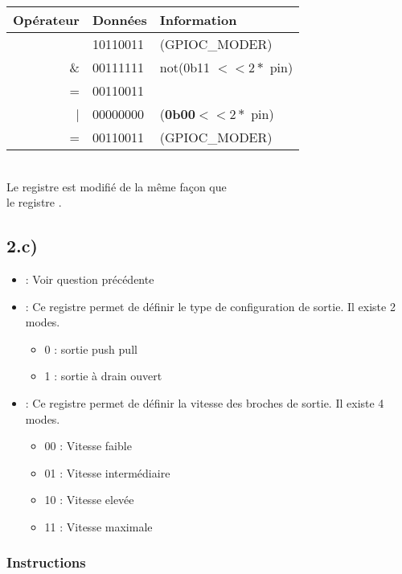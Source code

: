 \documentclass[12pt]{report}
\renewcommand{\bold}[1]{\textbf{#1}}
\begin{document}
\begin{tabular}{rl|l}
  Opérateur & Données & Information \\
\hline
    & 10110011 & (GPIOC\_MODER)\\
  \& & 00111111 & not(0b11 $<< 2*$ pin) \\
  \hline
  = & 00110011 &  \\
  | & 00000000 & (\bold{0b00}$<<2*$ pin)  \\
  \hline
   = & 00110011 & (GPIOC\_MODER)  \\
\end{tabular} \\

Le registre  est modifié de la même façon que \\
le registre .


\subsection{2.c)}

\begin{itemize}

\item {} : Voir question précédente

 \item {} : Ce registre permet de définir le type de configuration de sortie. Il existe 2 modes.

  \begin{itemize}
    \item 0 : sortie push pull
    \item 1 : sortie à drain ouvert
  \end{itemize}

\item {} : Ce registre permet de définir la vitesse des broches de sortie. Il existe 4 modes.

  \begin{itemize}
    \item 00 : Vitesse faible
    \item 01 : Vitesse intermédiaire
    \item 10 : Vitesse elevée
    \item 11 : Vitesse maximale
  \end{itemize}



\end{itemize}


\subsubsection{Instructions}
\end{document}
